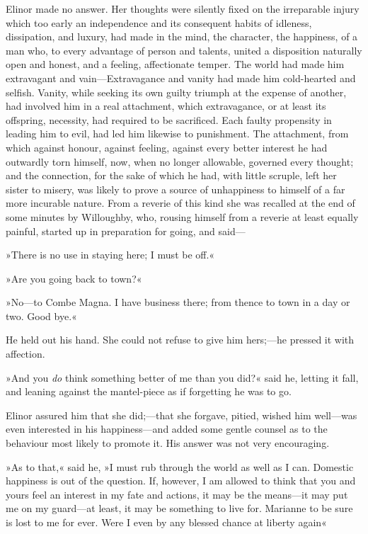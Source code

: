 Elinor made no answer. Her thoughts were silently fixed on the irreparable injury which too early an independence and its consequent habits of idleness, dissipation, and luxury, had made in the mind, the character, the happiness, of a man who, to every advantage of person and talents, united a disposition naturally open and honest, and a feeling, affectionate temper. The world had made him extravagant and vain—Extravagance and vanity had made him cold-hearted and selfish. Vanity, while seeking its own guilty triumph at the expense of another, had involved him in a real attachment, which extravagance, or at least its offspring, necessity, had required to be sacrificed. Each faulty propensity in leading him to evil, had led him likewise to punishment. The attachment, from which against honour, against feeling, against every better interest he had outwardly torn himself, now, when no longer allowable, governed every thought; and the connection, for the sake of which he had, with little scruple, left her sister to misery, was likely to prove a source of unhappiness to himself of a far more incurable nature. From a reverie of this kind she was recalled at the end of some minutes by Willoughby, who, rousing himself from a reverie at least equally painful, started up in preparation for going, and said—

»There is no use in staying here; I must be off.«

»Are you going back to town?«

»No—to Combe Magna. I have business there; from thence to town in a day or two. Good bye.«

He held out his hand. She could not refuse to give him hers;—he pressed it with affection.

»And you \textit{do} think something better of me than you did?« said he, letting it fall, and leaning against the mantel-piece as if forgetting he was to go.

Elinor assured him that she did;—that she forgave, pitied, wished him well—was even interested in his happiness—and added some gentle counsel as to the behaviour most likely to promote it. His answer was not very encouraging.

»As to that,« said he, »I must rub through the world as well as I can. Domestic happiness is out of the question. If, however, I am allowed to think that you and yours feel an interest in my fate and actions, it may be the means—it may put me on my guard—at least, it may be something to live for. Marianne to be sure is lost to me for ever. Were I even by any blessed chance at liberty again\longdash«

